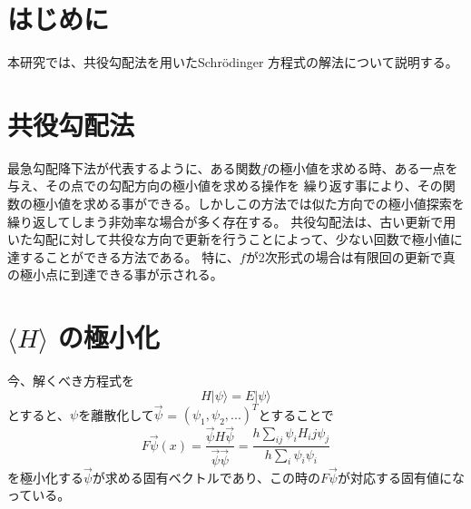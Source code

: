 \documentclass[a4j,twocolumn]{jarticle}
\begin{document}
\newcommand{\vv}[1]{\mbox{\boldmath{$#1$}}}
\def\e{{\rm e}}
\topmargin -2.5cm
\textheight 26cm
\raggedbottom



\section{はじめに}
本研究では、共役勾配法を用いたSchr\"odinger  方程式の解法について説明する。

\vspace{-3mm}
\section{共役勾配法}
最急勾配降下法が代表するように、ある関数$f$の極小値を求める時、ある一点を与え、その点での勾配方向の極小値を求める操作を
繰り返す事により、その関数の極小値を求める事ができる。しかしこの方法では似た方向での極小値探索を繰り返してしまう非効率な場合が多く存在する。
共役勾配法は、古い更新で用いた勾配に対して共役な方向で更新を行うことによって、少ない回数で極小値に達することができる方法である。
特に、$f$が2次形式の場合は有限回の更新で真の極小点に到達できる事が示される。


\vspace{-6mm}
\section{$\langle H \rangle$ の極小化}
今、解くべき方程式を
\begin{displaymath}
H|\psi\rangle = E|\psi\rangle
\end{displaymath}
とすると、$\psi$を離散化して$\vec{\psi}$ = $(\psi_1, \psi_2, ...)^T$とすることで
\begin{displaymath}
F\vec{\psi}(x) = \frac{\vec{\psi}H\vec{\psi}}{\vec{\psi}\vec{\psi}} = \frac{h\sum_{ij}\psi_i H_ij \psi_j}{h\sum_{i}\psi_i\psi_i}
\end{displaymath}
を極小化する$\vec{\psi}$が求める固有ベクトルであり、この時の$F\vec{\psi}$が対応する固有値になっている。
\end{document}

